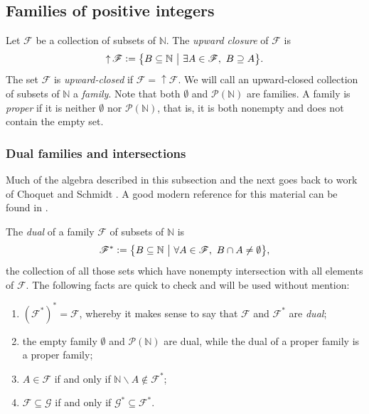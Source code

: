 \documentclass[letter,11pt]{article}
\theoremstyle{plain}
\theoremstyle{definition}
\theoremstyle{plain}
\theoremstyle{plain}
\numberwithin{equation}{section}
\newcommand{\N}{\mathbb{N}}
\newcommand{\defeq}{\vcentcolon=}
\renewcommand{\setminus}{\backslash}
\DeclareMathOperator{\upclose}{\uparrow}
\newcommand{\class}{\mathscr{F}}
\newcommand{\family}{\mathscr{F}}
\newcommand{\familytwo}{\mathscr{G}}
\begin{document}
\subsection{Families of positive integers}
\label{sec_combinatorics}

Let $\class$ be a collection of subsets of $\N$.  The \emph{upward closure} of $\class$ is
\[\upclose \class \defeq \big\{ B \subseteq \N \ \big| \ \exists A \in \class, \ B \supseteq A \big\}.\]
The set $\class$ is \emph{upward-closed} if $\class = \upclose \class$.  We will call an upward-closed collection of subsets of $\N$ a \emph{family}.  Note that both $\emptyset$ and $\mathcal{P}(\N)$ are families.  A family is \emph{proper} if it is neither $\emptyset$ nor $\mathcal{P}(\N)$, that is, it is both nonempty and does not contain the empty set.

\subsubsection{Dual families and intersections}
\label{sec_dual_families}

Much of the algebra described in this subsection and the next goes back to work of Choquet \cite{choquet_1947} and Schmidt \cite{schmidt_1952,schmidt_1953}.  A good modern reference for this material can be found in \cite[Section 2]{christopherson_johnson_2022}.

The \emph{dual} of a family $\family$ of subsets of $\N$ is
\[\family^* \defeq \big\{ B \subseteq \N \ \big | \ \forall A \in \family, \ B \cap A \neq \emptyset \big\},\]
the collection of all those sets which have nonempty intersection with all elements of $\family$.  The following facts are quick to check and will be used without mention:
\begin{enumerate}
    \item $(\family^*)^* = \family$, whereby it makes sense to say that $\family$ and $\family^*$ are \emph{dual};
    \item the empty family $\emptyset$ and $\mathcal{P}(\N)$ are dual, while the dual of a proper family is a proper family;
    \item $A \in \family$ if and only if $\N \setminus A \not\in \family^*$;
    \item $\family \subseteq \familytwo$ if and only if $\familytwo^* \subseteq \family^*$.\\
\end{enumerate}
\end{document}
